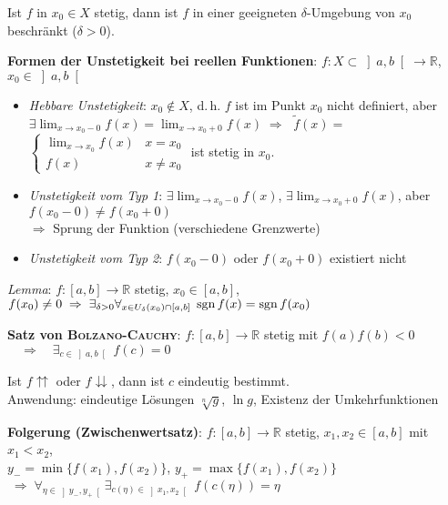 Ist $f$ in $x_0 \in X$ stetig, dann ist $f$ in einer geeigneten
$\delta$-Umgebung von $x_0$ beschränkt ($\delta > 0$).

\linie

\textbf{Formen der Unstetigkeit bei reellen Funktionen}:
$f: X \subset \left]a,b\right[ \rightarrow \mathbb{R}$,
$x_0 \in \left]a,b\right[$

\begin{itemize}
    \item \emph{Hebbare Unstetigkeit}: $x_0 \notin X$, d.\,h. $f$ ist im Punkt
    $x_0$ nicht definiert, aber \\
    $\exists \lim_{x \to x_0 - 0} f(x) =
    \lim_{x \to x_0 + 0} f(x) \;\Rightarrow\;$
    $\tilde{f}(x) =$ {\small
    $\begin{cases}
    \lim_{x \to x_0} f(x) & x = x_0 \\
    f(x) & x \not= x_0
    \end{cases}$} ist stetig in $x_0$.
    
    \item \emph{Unstetigkeit vom Typ 1}:
    $\exists \lim_{x \to x_0 - 0} f(x)$, $\exists \lim_{x \to x_0 + 0} f(x)$,
    aber $f(x_0 - 0) \not= f(x_0 + 0)$ \\
    $\Rightarrow$ Sprung der Funktion (verschiedene Grenzwerte)
    
    \item \emph{Unstetigkeit vom Typ 2}:
    $f(x_0 - 0)$ oder $f(x_0 + 0)$ existiert nicht
\end{itemize}

\linie

\emph{Lemma}: $f: [a,b] \rightarrow \mathbb{R}$ stetig, $x_0 \in [a,b]$,
$f(x_0) \not= 0 \;\Rightarrow\;
\exists_{\delta > 0} \forall_{x \in U_\delta(x_0) \cap [a,b]}\;
\operatorname{sgn} f(x) = \operatorname{sgn} f(x_0)$

\textbf{Satz von \textsc{Bolzano}-\textsc{Cauchy}}:
$f: [a,b] \rightarrow \mathbb{R}$ stetig mit $f(a)f(b) < 0$
$\quad\Rightarrow\quad \exists_{c \in \left]a,b\right[}\; f(c) = 0$

Ist $f\!\!\upuparrows$ oder $f\!\!\downdownarrows$, dann ist $c$ eindeutig
bestimmt. \\
Anwendung: eindeutige Lösungen $\sqrt[n]{g}$, $\ln g$, Existenz der
Umkehrfunktionen

\textbf{Folgerung (Zwischenwertsatz)}: $f: [a,b] \rightarrow \mathbb{R}$
stetig, $x_1, x_2 \in [a,b]$ mit $x_1 < x_2$, \\
$y_- = \min\{f(x_1), f(x_2)\}$, $y_+ = \max\{f(x_1), f(x_2)\}$
$\;\Rightarrow\; \forall_{\eta \in \left]y_-,y_+\right[}
\exists_{c(\eta) \in \left]x_1,x_2\right[}\; f(c(\eta)) = \eta$

